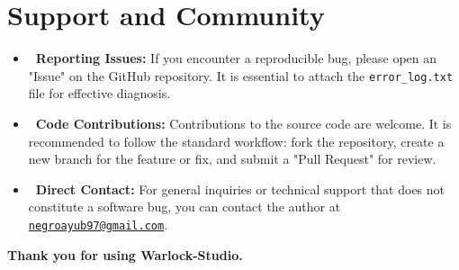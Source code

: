 \documentclass[11pt, a4paper]{article}
\newcommand{\SectionColor}{WarlockGray} %
\newcommand{\setsectioncolor}[1]{\renewcommand{\SectionColor}{#1}}
\begin{document}
\setsectioncolor{SupportColor}
\section{Support and Community}
\begin{itemize}[leftmargin=*]
    \item \textbf{\faBug\ Reporting Issues:} If you encounter a reproducible bug, please open an "Issue" on the GitHub repository. It is essential to attach the \texttt{error\_log.txt} file for effective diagnosis.
    \item \textbf{\faCodeBranch\ Code Contributions:} Contributions to the source code are welcome. It is recommended to follow the standard workflow: fork the repository, create a new branch for the feature or fix, and submit a "Pull Request" for review.
    \item \textbf{\faEnvelope\ Direct Contact:} For general inquiries or technical support that does not constitute a software bug, you can contact the author at \href{mailto:negroayub97@gmail.com}{\texttt{negroayub97@gmail.com}}.
\end{itemize}
\vspace{1cm}
\centering
\textbf{Thank you for using Warlock-Studio.}

\end{document}
